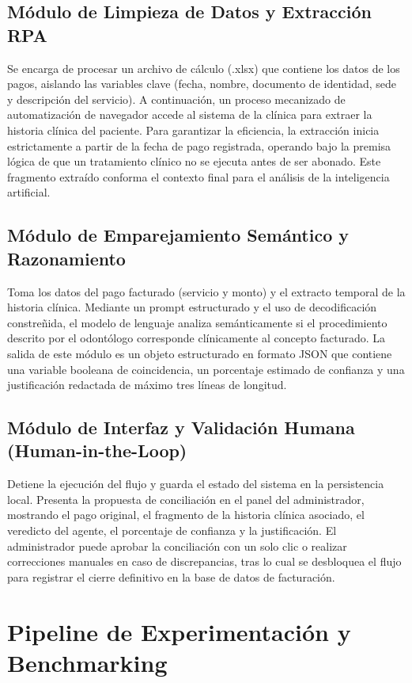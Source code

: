 \subsection{Módulo de Limpieza de Datos y Extracción RPA}
Se encarga de procesar un archivo de cálculo (.xlsx) que contiene los datos de los pagos, aislando las variables clave (fecha, nombre, documento de identidad, sede y descripción del servicio). A continuación, un proceso mecanizado de automatización de navegador accede al sistema de la clínica para extraer la historia clínica del paciente. Para garantizar la eficiencia, la extracción inicia estrictamente a partir de la fecha de pago registrada, operando bajo la premisa lógica de que un tratamiento clínico no se ejecuta antes de ser abonado. Este fragmento extraído conforma el contexto final para el análisis de la inteligencia artificial.

\subsection{Módulo de Emparejamiento Semántico y Razonamiento}
Toma los datos del pago facturado (servicio y monto) y el extracto temporal de la historia clínica. Mediante un prompt estructurado y el uso de decodificación constreñida, el modelo de lenguaje analiza semánticamente si el procedimiento descrito por el odontólogo corresponde clínicamente al concepto facturado. La salida de este módulo es un objeto estructurado en formato JSON que contiene una variable booleana de coincidencia, un porcentaje estimado de confianza y una justificación redactada de máximo tres líneas de longitud.

\subsection{Módulo de Interfaz y Validación Humana (Human-in-the-Loop)}
Detiene la ejecución del flujo y guarda el estado del sistema en la persistencia local. Presenta la propuesta de conciliación en el panel del administrador, mostrando el pago original, el fragmento de la historia clínica asociado, el veredicto del agente, el porcentaje de confianza y la justificación. El administrador puede aprobar la conciliación con un solo clic o realizar correcciones manuales en caso de discrepancias, tras lo cual se desbloquea el flujo para registrar el cierre definitivo en la base de datos de facturación.

\section{Pipeline de Experimentación y Benchmarking}

